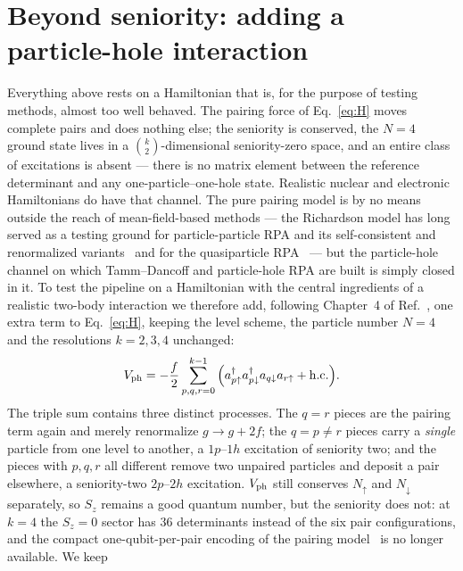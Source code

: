 \documentclass[
  aps,            %
  prc,            %
  reprint,        %
  superscriptaddress,
  floatfix,
  nofootinbib
]{revtex4-2}
\begin{document}
\section{Beyond seniority: adding a particle-hole interaction}
\label{sec:ph}
Everything above rests on a Hamiltonian that is, for the purpose of testing
methods, almost too well behaved.  The pairing force of Eq.~\eqref{eq:H} moves
complete pairs and does nothing else; the seniority is conserved, the $N=4$
ground state lives in a $\binom{k}{2}$-dimensional seniority-zero space, and an
entire class of excitations is absent --- there is no matrix element between
the reference determinant and any one-particle--one-hole state.  Realistic
nuclear and electronic Hamiltonians do have that channel.  The pure pairing
model is by no means outside the reach of mean-field-based methods --- the
Richardson model has long served as a testing ground for particle-particle
RPA and its self-consistent and renormalized
variants~\cite{Hirsch2002,Dang2006} and for the quasiparticle
RPA~\cite{RingSchuck} --- but the particle-hole channel on which Tamm--Dancoff
and particle-hole RPA are built is simply closed in it.  To test the pipeline on a
Hamiltonian with the central ingredients of a realistic two-body interaction
we therefore add, following Chapter~4 of Ref.~\cite{MHJbook}, one extra term
to Eq.~\eqref{eq:H}, keeping the level scheme, the particle number $N=4$ and the
resolutions $k=2,3,4$ unchanged:
\begin{equation}
  V_{\rm ph}=-\frac{f}{2}\sum_{p,q,r=0}^{k-1}\Big(
    a^\dagger_{p\uparrow}a^\dagger_{p\downarrow}a_{q\downarrow}a_{r\uparrow}
    +{\rm h.c.}\Big).
  \label{eq:Vph}
\end{equation}
The triple sum contains three distinct processes.  The $q=r$ pieces are the
pairing term again and merely renormalize $g\to g+2f$; the $q=p\neq r$ pieces
carry a \emph{single} particle from one level to another, a $1p$--$1h$
excitation of seniority two; and the pieces with $p,q,r$ all different remove
two unpaired particles and deposit a pair elsewhere, a seniority-two $2p$--$2h$
excitation.  $V_{\rm ph}$ still conserves $N_\uparrow$ and $N_\downarrow$
separately, so $S_z$ remains a good quantum number, but the seniority does not:
at $k=4$ the $S_z=0$ sector has $36$ determinants instead of the six pair
configurations, and the compact one-qubit-per-pair encoding of the pairing
model~\cite{Lacroix2020,AychetClaisse2026} is no longer available.  We keep
\end{document}
